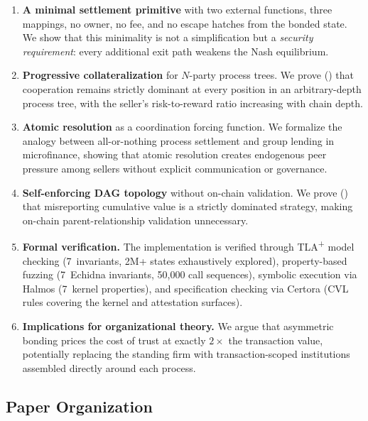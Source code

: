 \documentclass[11pt,a4paper]{article}
\theoremstyle{definition}
\theoremstyle{remark}
\begin{document}
\begin{enumerate}[label=(\roman*)]
  \item \textbf{A minimal settlement primitive} with two external
    functions, three mappings, no owner, no fee, and no escape hatches
    from the bonded state. We show that this minimality is not a
    simplification but a \emph{security requirement}: every additional
    exit path weakens the Nash equilibrium.

  \item \textbf{Progressive collateralization} for $N$-party process
    trees. We prove () that cooperation remains
    strictly dominant at every position in an arbitrary-depth process
    tree, with the seller's risk-to-reward ratio increasing with chain
    depth.

  \item \textbf{Atomic resolution} as a coordination forcing function.
    We formalize the analogy between all-or-nothing process settlement
    and group lending in microfinance, showing that atomic resolution
    creates endogenous peer pressure among sellers without explicit
    communication or governance.

  \item \textbf{Self-enforcing DAG topology} without on-chain
    validation. We prove () that
    misreporting cumulative value is a strictly dominated strategy,
    making on-chain parent-relationship validation unnecessary.

  \item \textbf{Formal verification.} The implementation is verified
    through TLA\textsuperscript{+} model checking (7~invariants,
    2M+ states exhaustively explored), property-based fuzzing
    (7~Echidna invariants, 50{,}000 call sequences), symbolic execution
    via Halmos (7~kernel properties), and specification checking via
    Certora (CVL rules covering the kernel and attestation surfaces).

  \item \textbf{Implications for organizational theory.} We argue that
    asymmetric bonding prices the cost of trust at exactly $2\times$ the
    transaction value, potentially replacing the standing firm with
    transaction-scoped institutions assembled directly around each
    process.
\end{enumerate}

\subsection{Paper Organization}
\end{document}
